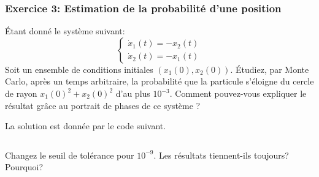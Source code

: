         \subsubsection{Exercice 3: Estimation de la probabilité d'une position}
            Étant donné le système suivant:
            \begin{equation*}
                \begin{cases}
                    \dot{x}_1(t) = -x_2(t)\\
                    \dot{x}_2(t) = -x_1(t)
                \end{cases}
            \end{equation*}
            Soit un ensemble de conditions initiales $(x_1(0), x_2(0))$. 
            Étudiez, par Monte Carlo, après un temps arbitraire, la probabilité que la particule s'éloigne du cercle de rayon $x_1(0)^2 + x_2(0)^2$ d'au plus $10^{-3}$. Comment pouvez-vous expliquer le résultat grâce au portrait de phases de ce système ?
            
            La solution est donnée par le code suivant.
            \inputminted{python}{codes/montecarlo_trajectoires_cercle.py}

            Changez le seuil de tolérance pour $10^{-9}$. Les résultats tiennent-ils toujours? Pourquoi?